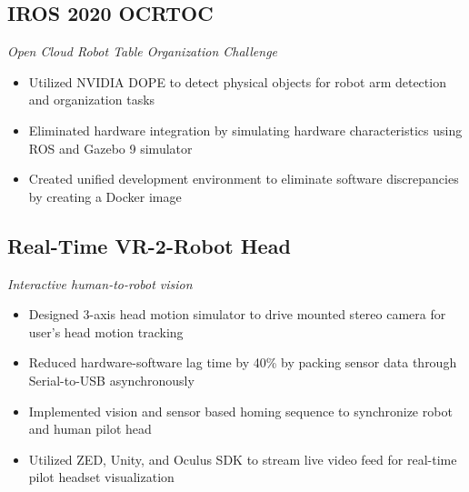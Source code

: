 \documentclass[11pt]{article}
\begin{document}

        \subsection*{IROS 2020 OCRTOC}
            \vspace{-0.2cm}
            \textit{Open Cloud Robot Table Organization Challenge} \vspace {-0.1cm}
            \begin{itemize}[noitemsep]
                \item Utilized NVIDIA DOPE to detect physical objects for robot arm detection and organization tasks
                \item Eliminated hardware integration by simulating hardware characteristics using ROS and
                Gazebo 9 simulator
                \item Created unified development environment to eliminate software discrepancies by creating a
                Docker image
            \end{itemize}

        \subsection*{Real-Time VR-2-Robot Head}
            \vspace{-0.2cm}
            \textit{Interactive human-to-robot vision}
            \vspace{-0.1cm}
            \begin{itemize}[noitemsep]
                \item Designed 3-axis head motion simulator to drive mounted stereo camera for user's head motion tracking
                \item Reduced hardware-software lag time by 40\% by packing sensor data through Serial-to-USB asynchronously
                \item Implemented vision and sensor based homing sequence to synchronize robot and human pilot head
                \item Utilized ZED, Unity, and Oculus SDK to stream live video feed for real-time pilot headset visualization
            \end{itemize} 
\end{document}
